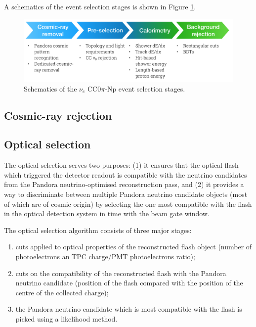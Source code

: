 A schematics of the event selection stages is shown in Figure \ref{fig:selection}.

\begin{figure}[htbp]
\centering
  \includegraphics[width=0.9\linewidth]{figures/selection.png}
  \caption{Schematics of the $\nu_e$ CC0$\pi$-Np event selection stages.}
  \label{fig:selection}
\end{figure}

\subsection{Cosmic-ray rejection}\label{sec:cosmicremoval}


\subsection{Optical selection}\label{sec:optical_pre_cuts}
The optical selection serves two purposes: (1) it ensures that the optical flash which triggered the detector readout is compatible with the neutrino candidates from the Pandora neutrino-optimised reconstruction pass, and (2) it provides a way to discriminate between multiple Pandora neutrino candidate objects (most of which are of cosmic origin) by selecting the one most compatible with the flash in the optical detection system in time with the beam gate window.

The optical selection algorithm consists of three major stages:
\begin{enumerate}
\item cuts applied to optical properties of the reconstructed flash object (number of photoelectrons an TPC charge/PMT photoelectrons ratio);
\item cuts on the compatibility of the reconstructed flash with the Pandora neutrino candidate (position of the flash compared with the position of the centre of the collected charge);
\item the Pandora neutrino candidate which is most compatible with the flash is picked using a likelihood method.
\end{enumerate}


